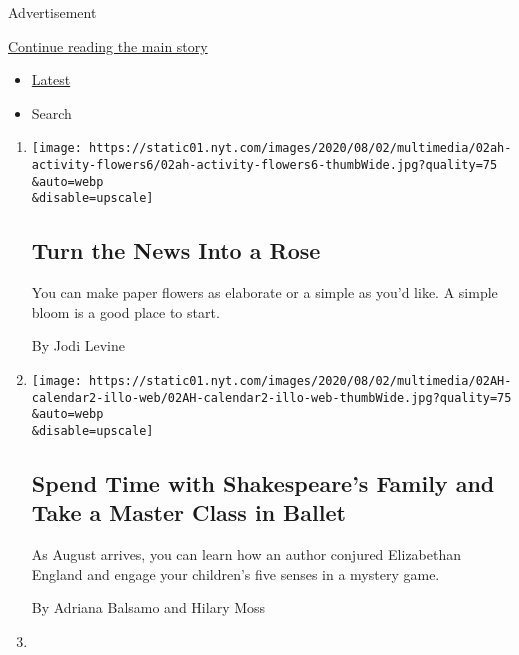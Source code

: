 Advertisement

\protect\hyperlink{after-mid1}{Continue reading the main story}

\begin{itemize}
\tightlist
\item
  \protect\hyperlink{stream-panel}{Latest}
\item
  Search
\end{itemize}

\begin{enumerate}
\def\labelenumi{\arabic{enumi}.}
\item
  \href{/2020/08/01/at-home/coronavirus-paper-flowers.html}{}

  \texttt{[image: https://static01.nyt.com/images/2020/08/02/multimedia/02ah-activity-flowers6/02ah-activity-flowers6-thumbWide.jpg?quality=75\\\&auto=webp\\\&disable=upscale]}

  \hypertarget{turn-the-news-into-a-rose}{%
  \subsection{Turn the News Into a
  Rose}\label{turn-the-news-into-a-rose}}

  You can make paper flowers as elaborate or a simple as you'd like. A
  simple bloom is a good place to start.

  By Jodi Levine
\item
  \href{/2020/08/01/at-home/coronavirus-things-to-do-this-week.html}{}

  \texttt{[image: https://static01.nyt.com/images/2020/08/02/multimedia/02AH-calendar2-illo-web/02AH-calendar2-illo-web-thumbWide.jpg?quality=75\\\&auto=webp\\\&disable=upscale]}

  \hypertarget{spend-time-with-shakespeares-family-and-take-a-master-class-in-ballet}{%
  \subsection{Spend Time with Shakespeare's Family and Take a Master
  Class in
  Ballet}\label{spend-time-with-shakespeares-family-and-take-a-master-class-in-ballet}}

  As August arrives, you can learn how an author conjured Elizabethan
  England and engage your children's five senses in a mystery game.

  By Adriana Balsamo and Hilary Moss
\item
  \href{/2020/08/01/at-home/coronavirus-make-pizza-on-a-grill.html}{}


\end{enumerate}
